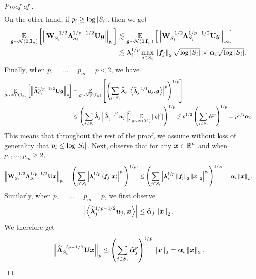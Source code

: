 \documentclass[11pt]{article}
\numberwithin{equation}{section}
\begin{document}
\begin{proof}[Proof of ]
\begin{align*}
\end{align*}
On the other hand, if $p_i \ge \log\left\lvert S_i \right\rvert$, then we get
\begin{align*}
    \underset{\bm{g}\sim\mathcal{N}(0,\mathbf{I}_n)}{\mathbb{E}}\left[\left\lVert \mathbf{W}^{-1/2}_{S_i}\mathbf{\Lambda}^{1/p-1/2}_{S_i}\mathbf{U}\bm{g} \right\rVert_{p_i}\right] &\lesssim \underset{\bm{g}\sim\mathcal{N}(0,\mathbf{I}_n)}{\mathbb{E}}\left[\left\lVert \mathbf{W}^{-1/2}_{S_i}\mathbf{\Lambda}^{1/p-1/2}_{S_i}\mathbf{U}\bm{g} \right\rVert_{\infty}\right] \\
    &\lesssim  \bm{\lambda}_i^{1/p}\max_{j\in S_i}\left\lVert \bm{f}_j \right\rVert_2\sqrt{\log\left\lvert S_i \right\rvert} \asymp\bm{\alpha}_i\sqrt{\log\left\lvert S_i \right\rvert}.
\end{align*}
Finally, when $p_1=\dots=p_m=p < 2$, we have
\begin{align*}
    \underset{\bm{g}\sim\mathcal{N}(0,\mathbf{I}_n)}{\mathbb{E}}\left[\left\lVert \widehat{\mathbf{\Lambda}}_{S_i}^{1/p-1/2}\mathbf{U}\bm{g} \right\rVert_p\right] &= \underset{\bm{g}\sim\mathcal{N}(0,\mathbf{I}_n)}{\mathbb{E}}\left[\left(\sum_{j \in S_i}\widehat{\bm{\lambda}}_j\left\lvert \left\langle \widehat{\bm{\lambda}}_j^{-1/2}\bm{u}_j,\bm{g} \right\rangle \right\rvert^{p}\right)^{1/p}\right] \\
    &\le \left(\sum_{j\in S_i} \widehat{\bm{\lambda}}_j\left\lVert \widehat{\bm{\lambda}}_j^{-1/2}\bm{u}_j \right\rVert_2^p\underset{g\sim\mathcal{N}(0,1)}{\mathbb{E}}\left[\left\lvert g \right\rvert^{p}\right]\right)^{1/p} \lesssim p^{1/2}\left(\sum_{j \in S_i} \widehat{\bm{\alpha}}^p\right)^{1/p} = p^{1/2}\bm{\alpha}_i.
\end{align*}
This means that throughout the rest of the proof, we assume without loss of generality that $p_i \le \log\left\lvert S_i \right\rvert$. Next, observe that for any $\bm{x}\in\mathbb{R}^n$ and when $p_1,\dots,p_m \ge 2$,
\begin{align*}
    \left\lVert \mathbf{W}^{-1/2}_{S_i}\mathbf{\Lambda}^{1/p-1/2}_{S_i}\mathbf{U}\bm{x} \right\rVert_{p_i} = \left(\sum_{j \in S_i} \left\lvert \bm{\lambda}_i^{1/p}\left\langle \bm{f}_j,\bm{x} \right\rangle \right\rvert^{p_i}\right)^{1/p_i} \le \left(\sum_{j \in S_i} \left\lvert \bm{\lambda}_i^{1/p}\left\lVert \bm{f}_j \right\rVert_2\left\lVert \bm{x} \right\rVert_2 \right\rvert^{p_i}\right)^{1/p_i} = \bm{\alpha}_i\left\lVert \bm{x} \right\rVert_2.
\end{align*}
Similarly, when $p_1=\dots=p_m=p$, we first observe
\begin{align*}
    \left\lvert \left\langle \widehat{\bm{\lambda}}_j^{1/p-1/2}\bm{u}_j,\bm{x} \right\rangle \right\rvert \le \widehat{\bm{\alpha}}_j\left\lVert \bm{x} \right\rVert_2.
\end{align*}
We therefore get
\begin{align}
    \left\lVert \widehat{\mathbf{\Lambda}}_{S_i}^{1/p-1/2}\mathbf{U}\bm{x} \right\rVert_p \le \left(\sum_{j \in S_i} \widehat{\bm{\alpha}}_j^p\right)^{1/p}\left\lVert \bm{x} \right\rVert_2 = \bm{\alpha}_i\left\lVert \bm{x} \right\rVert_2.\label{eq:alpha_alleq_lipschitz}
\end{align}


\end{proof}
\end{document}
